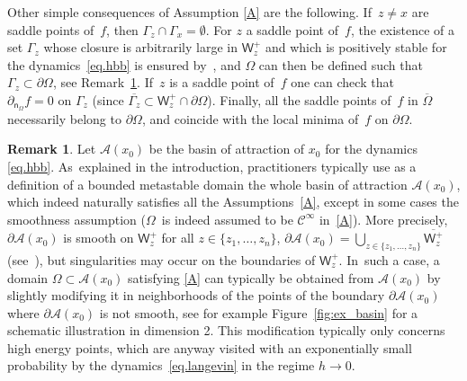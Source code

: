 \documentclass[JEP,XML,SOM,Unicode,NoEqCountersInSection,NoFloatCountersInSection,published]{cedram}
\let\pa\partial
\theoremstyle{plain}
\theoremstyle{definition}
\newtheorem{remark}[proposition]{Remark}
\begin{document}
Other simple consequences of Assumption \ref{A} are the following. If~$z\neq x$ are saddle
points of~$f$, then $\Gamma_z\cap \Gamma_x=\emptyset$. For $z$ a
saddle point of~$f$, the existence of a set $\Gamma_z$ whose
closure is arbitrarily large in $\mathsf W_z^+$ and which is
positively stable for the dynamics~\eqref{eq.hbb} is ensured
by~\cite[Prop.\,80]{DLLN}, and $\Omega$ can then be defined such
that $\Gamma_z \subset \partial \Omega$, see Remark~\ref{rem:smooth_basin}. If~$z$ is a saddle point of~$f$ one can check that
$\partial_{\mathsf n_\Omega} f=0\text{ on } \Gamma_z$ (since $\overline{\Gamma_z}\subset \mathsf W_z^+\cap \partial \Omega$).
Finally, all the saddle points of~$f$ in
$\overline{\Omega}$ necessarily belong to $\partial \Omega$, and
coincide with the local minima of~$f$ on $\partial \Omega$.

\begin{remark}\label{rem:smooth_basin} Let $\mathcal A(x_0)$ be the basin of attraction of $x_0$ for the
dynamics \eqref{eq.hbb}. As~explained in the
introduction, practitioners typically use as a definition
of a bounded metastable domain the whole basin of attraction $\mathcal
A(x_0)$, which indeed naturally satisfies all the Assumptions~\ref{A},
except in some cases the smoothness assumption ($\Omega$~is indeed assumed
to be $\mathcal C^\infty$ in~\ref{A}). More precisely, $\pa \mathcal A(x_0)$ is
smooth on $\mathsf W_z^+$ for all $z \in
\{z_1,\ldots,z_n\}$, $\pa \mathcal A(x_0)=\bigcup_{z \in
\{z_1,\ldots,z_n\}} \overline{\mathsf W_z^+}$ (see~\cite[Th.\,B.13]{menz-schlichting-14}), but singularities may occur on the
boundaries of $\mathsf W_z^+$. In~such a case, a domain $\Omega \subset \mathcal
A(x_0)$ satisfying \ref{A} can typically be obtained from $\mathcal
A(x_0)$ by slightly modifying it in neighborhoods
of the points of the boundary $\pa \mathcal A(x_0)$ where $\pa \mathcal
A(x_0)$ is not smooth, see for example Figure~\ref{fig:ex_basin} for
a schematic illustration in dimension 2. This modification typically only
concerns high energy points, which are anyway visited with an
exponentially small probability by the dynamics~\eqref{eq.langevin}
in the regime $h \to 0$.

\begin{figure}
\begin{center}
\end{center}
\end{figure}
\end{remark}
\end{document}
